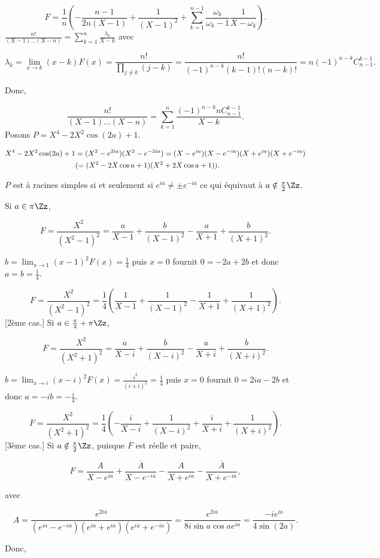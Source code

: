 {{$$F=\frac{1}{n}(-\frac{n-1}{2n(X-1)}+\frac{1}{(X-1)^2}+\sum_{k=1}^{n-1}\frac{\omega_k}{\omega_k-1}\frac{1}{X-\omega_k}).$$
$\frac{n!}{(X-1)...(X-n)}=\sum_{k=1}^{n}\frac{\lambda_k}{X-k}$ avec

$$\lambda_k=\lim_{x\rightarrow k}(x-k)F(x)=\frac{n!}{\prod_{j\neq k}^{}(j-k)}=\frac{n!}{(-1)^{n-k}(k-1)!(n-k)!}=n(-1)^{n-k}C_{n-1}^{k-1}.$$

Donc,

$$\frac{n!}{(X-1)...(X-n)}=\sum_{k=1}^{n}\frac{(-1)^{n-k}nC_{n-1}^{k-1}}{X-k}.$$
Posons $P=X^4-2X^2\cos(2a)+1$.

\begin{align*}\ensuremath
X^4-2X^2\cos(2a)+1&=(X^2-e^{2ia})(X^2-e^{-2ia})=(X-e^{ia})(X-e^{-ia})(X+e^{ia})(X+e^{-ia})\\
 &(=(X^2-2X\cos a+1)(X^2+2X\cos a+1)).
\end{align*}

$P$ est à racines simples si et seulement si $e^{ia}\neq\pm e^{-ia}$ ce qui équivaut à $a\notin\frac{\pi}{2}\Zz$.

\begin{itemize}
[1er cas.] Si $a\in\pi\Zz$,

$$F=\frac{X^2}{(X^2-1)^2}=\frac{a}{X-1}+\frac{b}{(X-1)^2}-\frac{a}{X+1}+\frac{b}{(X+1)^2}.$$

$b=\lim_{x\rightarrow 1}(x-1)^2F(x)=\frac{1}{4}$ puis $x=0$ fournit $0=-2a+2b$ et donc $a=b=\frac{1}{4}$.

$$F=\frac{X^2}{(X^2-1)^2}=\frac{1}{4}(\frac{1}{X-1}+\frac{1}{(X-1)^2}-\frac{1}{X+1}+\frac{1}{(X+1)^2}).$$
[2ème cas.] Si $a\in\frac{\pi}{2}+\pi\Zz$,

$$F=\frac{X^2}{(X^2+1)^2}=\frac{a}{X-i}+\frac{b}{(X-i)^2}-\frac{a}{X+i}+\frac{b}{(X+i)^2}.$$

$b=\lim_{x\rightarrow i}(x-i)^2F(x)=\frac{i^2}{(i+i)^2}=\frac{1}{4}$ puis $x=0$ fournit $0=2ia-2b$ et donc $a=-ib=-\frac{i}{4}$.

$$F=\frac{X^2}{(X^2+1)^2}=\frac{1}{4}(-\frac{i}{X-i}+\frac{1}{(X-i)^2}+\frac{i}{X+i}+\frac{1}{(X+i)^2}).$$
[3ème cas.] Si $a\notin\frac{\pi}{2}\Zz$, puisque $F$ est réelle et paire,

$$F=\frac{A}{X-e^{ia}}+\frac{\overline{A}}{X-e^{-ia}}-\frac{A}{X+e^{ia}}-\frac{\overline{A}}{X+e^{-ia}},$$

avec 

$$A=\frac{e^{2ia}}{(e^{ia}-e^{-ia})(e^{ia}+e^{ia})(e^{ia}+e^{-ia})}=\frac{e^{2ia}}{8i\sin a\cos ae^{ia}}=\frac{-ie^{ia}}{4\sin(2a)}.$$

Donc,


\end{itemize}}}
